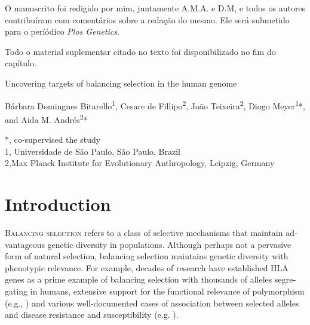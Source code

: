 \begin{refsection}
O manuscrito foi redigido por mim, juntamente A.M.A. e D.M, e todos os autores contribuíram com comentários sobre a redação do mesmo. Ele será submetido para o períódico \emph{Plos Genetics}.

Todo o material suplementar citado no texto foi disponibilizado no fim do capítulo.
%


\newpage

\begin{otherlanguage}{english}
\begin{center}
\LARGE{Uncovering targets of balancing selection in the human genome}
\end{center}

\begin{center}
Bárbara Domingues Bitarello\textsuperscript{1}, Cesare de Fillipo\textsuperscript{2}, João Teixeira\textsuperscript{2}, Diogo Meyer\textsuperscript{1}*, and Aida M. Andrés\textsuperscript{2}*
\end{center}

\small{*, co-supervised the study}
\\
\small{1, Universidade de São Paulo, São Paulo, Brazil}
\\
\small{2,Max Planck Institute for Evolutionary Anthropology, Leipzig, Germany}

\section{Introduction}

\lettrine[lines=3]{\color{airforceblue}B}{alancing selection} refers to a class of selective mechanisms that maintain advantageous genetic diversity in populations. Although perhaps not a pervasive form of natural selection, balancing selection maintains genetic diversity with phenotypic relevance. For example, decades of research have established HLA genes as a prime example of balancing selection \parencite{Meyer2001a,Spurgin2010} with thousands of alleles segregating in humans, extensive support for the functional relevance of polymorphism (e.g., \cite{Hedrick1991,Prugnolle2005}) and various well-documented cases of association between selected alleles and disease resistance and susceptibility (e.g. \cite{Raychaudhuri2012,Howell2014}).


\end{otherlanguage}
\end{refsection}

